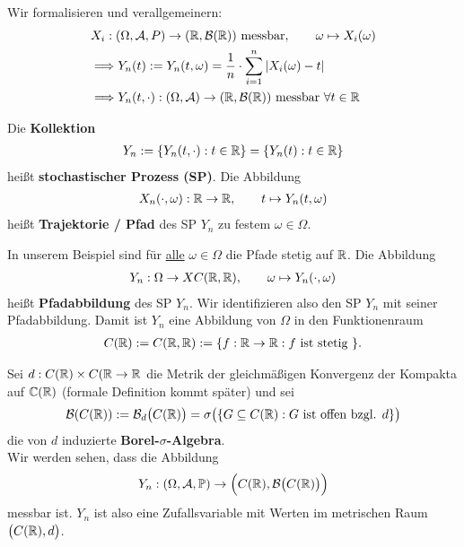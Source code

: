 Wir formalisieren und verallgemeinern:
\begin{align*}
	&X_i:(\Omega, \mathcal{A},P)\to(\mathbb{R},\mathcal{B}(\mathbb{R}))\text{ messbar},\qquad\omega\mapsto X_i(\omega)\\
	&\Longrightarrow
	Y_n(t):=Y_n(t,\omega)=
	\frac{1}{n}\cdot\sum\limits_{i=1}^n\left|X_i(\omega)-t\right|\\
	&\Longrightarrow
	Y_n(t,\cdot):(\Omega,\mathcal{A})\to(\mathbb{R},\mathcal{B}(\mathbb{R}))\text{ messbar }\forall t\in\mathbb{R}
\end{align*}

\begin{defi}
	Die \textbf{Kollektion}
	\begin{align*}
		Y_n:=\lbrace Y_n(t,\cdot):t\in\mathbb{R}\rbrace
		=\lbrace Y_n(t):t\in\mathbb{R}\rbrace
	\end{align*}
	heißt \textbf{stochastischer Prozess (SP)}. Die Abbildung
	\begin{align*}
		X_n(\cdot,\omega):\mathbb{R}\to\mathbb{R},\qquad t\mapsto Y_n(t,\omega)
	\end{align*}
	heißt \textbf{Trajektorie / Pfad} des SP $Y_n$ zu festem $\omega\in\Omega$.
\end{defi}

In unserem Beispiel sind für \underline{alle} $\omega\in\Omega$ die Pfade stetig auf $\mathbb{R}$. Die Abbildung
\begin{align*}
	Y_n:\Omega\to X C(\mathbb{R},\mathbb{R}),\qquad\omega\mapsto Y_n(\cdot,\omega)
\end{align*}
heißt \textbf{Pfadabbildung} des SP $Y_n$. Wir identifizieren also den SP $Y_n$ mit seiner Pfadabbildung. Damit ist $Y_n$ eine Abbildung von $\Omega$ in den Funktionenraum 
\begin{align*}
	C(\mathbb{R}):=C(\mathbb{R},\mathbb{R}):=\lbrace f:\mathbb{R}\to\mathbb{R}: f\text{ ist stetig }\rbrace.
\end{align*}

Sei $d:C(\mathbb{R})\times C(\mathbb{R}\to\mathbb{R}$ die Metrik der gleichmäßigen Konvergenz der Kompakta auf $\mathbb{C}(\mathbb{R})$ (formale Definition kommt später) und sei
\begin{align*}
	\mathcal{B}(C(\mathbb{R})):=\mathcal{B}_d\big(C(\mathbb{R})\big)=\sigma\big(\lbrace G\subseteq C(\mathbb{R}):G\text{ ist offen bzgl. }d\rbrace\big)
\end{align*}
die von $d$ induzierte \textbf{Borel-$\sigma$-Algebra}.\\
Wir werden sehen, dass die Abbildung
\begin{align*}
	Y_n:(\Omega,\mathcal{A},\mathbb{P})\to\Big(C(\mathbb{R}),\mathcal{B}\big(C(\mathbb{R})\big)\Big)
\end{align*}
messbar ist. $Y_n$ ist also eine Zufallsvariable mit Werten im metrischen Raum $\big(C(\mathbb{R}),d\big)$.

